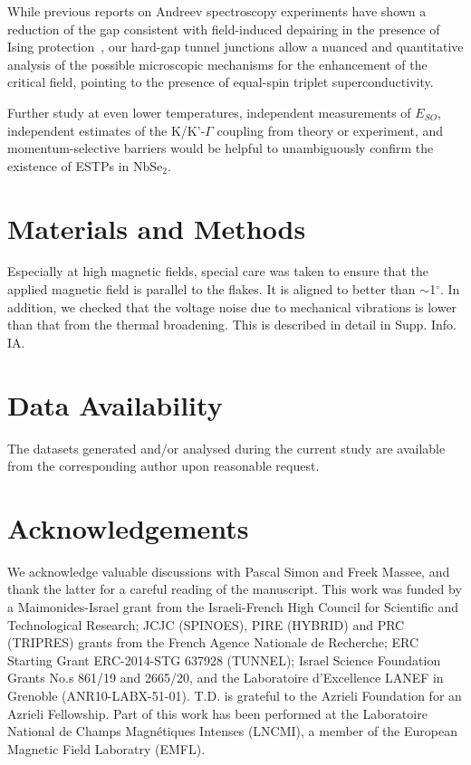 \documentclass[showpacs,superscriptaddress,preprint,prb]{revtex4}
\begin{document}
While previous reports on Andreev spectroscopy experiments have shown a reduction of the gap consistent with field-induced depairing in the presence of Ising protection~\cite{sohn2018}, our hard-gap tunnel junctions allow a nuanced and quantitative analysis of the possible microscopic mechanisms for the enhancement of the critical field, pointing to the presence of equal-spin triplet superconductivity.

Further study at even lower temperatures, independent measurements of $E_{SO}$, independent estimates of the K/K'-$\Gamma$ coupling from theory or experiment, and momentum-selective barriers would be helpful to unambiguously confirm the existence of ESTPs in NbSe$_2$. 


\section{Materials and Methods} Especially at high magnetic fields, special care was taken to ensure that the applied magnetic field is parallel to the flakes. It is aligned to better than $\sim$1$^\circ$. In addition, we checked that the voltage noise due to mechanical vibrations is lower than that from the thermal broadening. This is described in detail in Supp. Info. IA.

\section{Data Availability} The datasets generated and/or analysed during the current study are available from the corresponding author upon reasonable request.
 
\section{Acknowledgements} We acknowledge valuable discussions with Pascal Simon and Freek Massee, and thank the latter for a careful reading of the manuscript. This work was funded by a Maimonides-Israel grant from the Israeli-French High Council for Scientific and Technological Research; JCJC (SPINOES), PIRE (HYBRID) and PRC (TRIPRES) grants from the French Agence Nationale de Recherche; ERC Starting Grant ERC-2014-STG 637928 (TUNNEL); Israel Science Foundation Grants No.s 861/19 and 2665/20, and the Laboratoire d’Excellence LANEF in Grenoble (ANR10-LABX-51-01). T.D. is grateful to the Azrieli Foundation for an Azrieli Fellowship. Part of this work has been performed at the Laboratoire National de Champs Magnétiques Intenses (LNCMI), a member of the European Magnetic Field Laboratry (EMFL).




\end{document}

